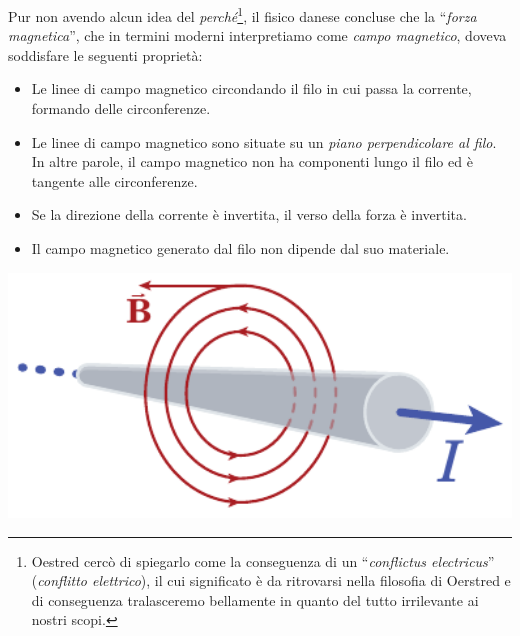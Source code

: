 Pur non avendo alcun idea del \textit{perché}\footnote{Oestred cercò di spiegarlo come la conseguenza di un ``\textit{conflictus electricus}'' (\textit{conflitto elettrico}), il cui significato è da ritrovarsi nella filosofia di Oerstred e di conseguenza tralasceremo bellamente in quanto del tutto irrilevante ai nostri scopi.}, il fisico danese concluse che la ``\textit{forza magnetica}'', che in termini moderni interpretiamo come \textit{campo magnetico}, doveva soddisfare le seguenti proprietà:\\
\begin{minipage}{0.69\textwidth}
	\begin{itemize}
		\item Le linee di campo magnetico circondando il filo in cui passa la corrente, formando delle circonferenze.
		\item Le linee di campo magnetico sono situate su un \textit{piano perpendicolare al filo}. In altre parole, il campo magnetico non ha componenti lungo il filo ed è tangente alle circonferenze.
		\item Se la direzione della corrente è invertita, il verso della forza è invertita.
		\item Il campo magnetico generato dal filo non dipende dal suo materiale.
	\end{itemize}
\end{minipage}\hspace{5pt}
\begin{minipage}{0.3\textwidth}
	\begin{center}
		\includegraphics[width=1\textwidth]{images/chp7/chp7oersted2.pdf}
	\end{center}
\end{minipage}
